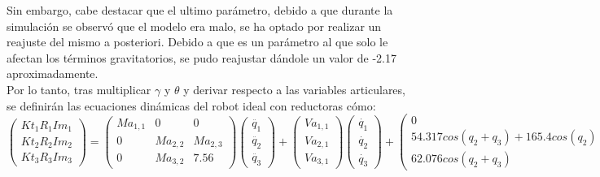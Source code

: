 Sin embargo, cabe destacar que el ultimo parámetro, debido a que durante la simulación se observó que el modelo era malo, se ha optado por realizar un reajuste del mismo a posteriori. Debido a que es un parámetro al que solo le afectan los términos gravitatorios, se pudo reajustar dándole un valor de -2.17 aproximadamente. \\

Por lo tanto, tras multiplicar $\gamma$ y $\theta$ y derivar respecto a las variables articulares, se definirán las ecuaciones dinámicas del robot ideal con reductoras cómo:\\

\[
\begin{pmatrix}
Kt_{1}R_{1}Im_{1} \\

Kt_{2}R_{2}Im_{2} \\

Kt_{3}R_{3}Im_{3}
\end{pmatrix} =
\begin{pmatrix}
Ma_{1,1} & 0 & 0 \\

0 & Ma_{2,2} & Ma_{2,3}\\

0 & Ma_{3,2} & 7.56
\end{pmatrix}
\begin{pmatrix}
\ddot{q_{1}} \\

\ddot{q_{2}}  \\

\ddot{q_{3}}
\end{pmatrix} +
\begin{pmatrix}
Va_{1,1}\\

Va_{2,1} \\

Va_{3,1}
\end{pmatrix}
\begin{pmatrix}
\dot{q_{1}} \\

\dot{q_{2}}  \\

\dot{q_{3}}
\end{pmatrix} +
\begin{pmatrix}
0	\\

54.317cos(q_2 + q_3) + 165.4cos(q_2) \\

62.076cos(q_2 + q_3)
\end{pmatrix}\]



